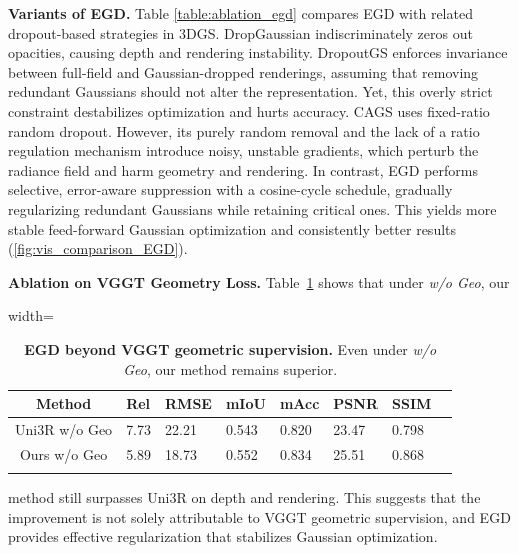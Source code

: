 \documentclass[runningheads]{llncs}
\begin{document}
\noindent
\textbf{Variants of EGD.}  
Table \ref{table:ablation_egd} compares EGD with related dropout-based strategies in 3DGS.   
DropGaussian \cite{dropgaussian} indiscriminately zeros out opacities, causing depth and rendering instability. 
DropoutGS \cite{dropoutgs} enforces invariance between full-field and Gaussian-dropped renderings, assuming that removing redundant Gaussians should not alter the representation. Yet, this overly strict constraint destabilizes optimization and hurts accuracy.  
CAGS \cite{chen2025quantifying} uses fixed-ratio random dropout. However, its purely random removal and the lack of a ratio regulation mechanism introduce noisy, unstable gradients, which perturb the radiance field and harm geometry and rendering.  
In contrast, EGD performs selective, error-aware suppression with a cosine-cycle schedule, gradually regularizing redundant Gaussians while retaining critical ones.
This yields more stable feed-forward Gaussian optimization and consistently better results (\ref{fig:vis_comparison_EGD}). 



\noindent
\textbf{Ablation on VGGT Geometry Loss.}
Table~\ref{table:more_ablation_vgg_geo} shows that under \emph{w/o Geo}, our 
\begin{table}
\vspace{-11mm}
\caption{\textbf{EGD beyond VGGT geometric supervision.} 
Even under \emph{w/o Geo}, our method remains superior.
}
\label{table:more_ablation_vgg_geo}
\vspace{-1mm}
\centering
\begin{adjustbox}{width=\linewidth}
\begin{tabular}{ c | p{0.85cm}<{\centering} p{0.95cm}<{\centering} p{0.95cm}<{\centering} p{0.95cm}<{\centering} p{0.95cm}<{\centering} p{0.95cm}<{\centering} p{0.95cm}<{\centering} }
\Xhline{3\arrayrulewidth}
Method & Rel & RMSE & mIoU & mAcc & PSNR & SSIM \\
\midrule[0.1pt]
Uni3R w/o Geo & 7.73 & 22.21 & 0.543 & 0.820 & 23.47 & 0.798 \\
Ours  w/o Geo & 5.89 & 18.73 & 0.552 & 0.834 & 25.51 & 0.868 \\
\Xhline{3\arrayrulewidth}
\end{tabular}
\end{adjustbox}
\vspace{-8.8mm}
\end{table}
method still surpasses Uni3R on depth and rendering. 
This suggests that the improvement is not solely attributable to VGGT  geometric supervision, and EGD provides effective regularization that stabilizes Gaussian optimization.
\end{document}

